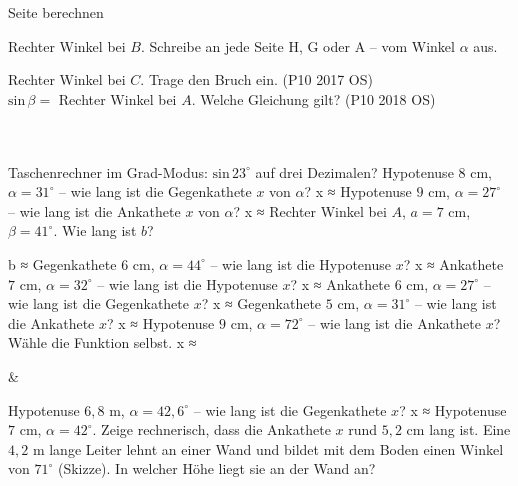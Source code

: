 \begin{aufgabe}{Seite berechnen}
\begin{teile}
\teil Rechter Winkel bei $B$. Schreibe an jede Seite H, G oder A – vom Winkel $\alpha$ aus.

\teil Rechter Winkel bei $C$. Trage den Bruch ein. \hfill (P10 2017 OS) \\

$\mathrm{sin}\,\beta =$ \leerfeld
\teil Rechter Winkel bei $A$. Welche Gleichung gilt? \hfill (P10 2018 OS) \\  \\  \\ 

\teil Taschenrechner im Grad-Modus: $\mathrm{sin}\,23^\circ$ auf drei Dezimalen? \leerfeld
\teil Hypotenuse $8$ cm, $\alpha = 31^\circ$ – wie lang ist die Gegenkathete $x$ von $\alpha$? x ≈ \leerfeld[cm]
\teil Hypotenuse $9$ cm, $\alpha = 27^\circ$ – wie lang ist die Ankathete $x$ von $\alpha$? x ≈ \leerfeld[cm]
\teil Rechter Winkel bei $A$, $a = 7$ cm, $\beta = 41^\circ$. Wie lang ist $b$?

b ≈ \leerfeld[cm]
\teil Gegenkathete $6$ cm, $\alpha = 44^\circ$ – wie lang ist die Hypotenuse $x$? x ≈ \leerfeld[cm]
\teil Ankathete $7$ cm, $\alpha = 32^\circ$ – wie lang ist die Hypotenuse $x$? x ≈ \leerfeld[cm]
\teil Ankathete $6$ cm, $\alpha = 27^\circ$ – wie lang ist die Gegenkathete $x$? x ≈ \leerfeld[cm]
\teil Gegenkathete $5$ cm, $\alpha = 31^\circ$ – wie lang ist die Ankathete $x$? x ≈ \leerfeld[cm]
\teil Hypotenuse $9$ cm, $\alpha = 72^\circ$ – wie lang ist die Ankathete $x$? Wähle die Funktion selbst. x ≈ \leerfeld[cm]
\end{teile}
\begin{gleichungsraster}[2]
 &
\end{gleichungsraster}
\begin{teile}
\teil Hypotenuse $6{,}8$ m, $\alpha = 42{,}6^\circ$ – wie lang ist die Gegenkathete $x$? x ≈ \leerfeld[m]
\teil Hypotenuse $7$ cm, $\alpha = 42^\circ$. Zeige rechnerisch, dass die Ankathete $x$ rund $5{,}2$ cm lang ist.
\teil Eine $4{,}2$ m lange Leiter lehnt an einer Wand und bildet mit dem Boden einen Winkel von $71^\circ$ (Skizze). In welcher Höhe liegt sie an der Wand an?


\end{teile}
\end{aufgabe}
